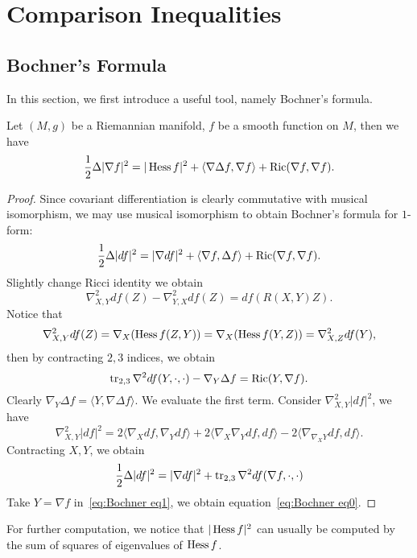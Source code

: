 \section{Comparison Inequalities}

\subsection{Bochner's Formula}

In this section, we first introduce a useful tool, namely Bochner's formula.

\begin{thm}
    Let $(M,g)$ be a Riemannian manifold, $f$ be a smooth function on $M$, then we have
    \[\frac{1}{2}\Delta|\nabla f|^2=|\operatorname{Hess}{f}|^2+\langle\nabla\Delta f,\nabla f\rangle+\operatorname{Ric}(\nabla f,\nabla f).\]
\end{thm}
\begin{proof}
    Since covariant differentiation is clearly commutative with musical isomorphism, we may use musical isomorphism to obtain Bochner's formula for $1$-form:
    \begin{equation}
        \frac{1}{2}\Delta|df|^2=|\nabla df|^2+\langle\nabla f,\Delta f\rangle+\operatorname{Ric}(\nabla f,\nabla f).\label{eq:Bochner eq0}
    \end{equation}
    Slightly change Ricci identity we obtain
    \[\nabla^2_{X,Y}df(Z)-\nabla^2_{Y,X}df(Z)=df(R(X,Y)Z).\]
    Notice that
    \[\nabla^2_{X,Y}df(Z)=\nabla_X(\operatorname{Hess}{f}(Z,Y))=\nabla_X(\operatorname{Hess}{f}(Y,Z))=\nabla^2_{X,Z}df(Y),\]
    then by contracting $2,3$ indices, we obtain
    \begin{equation}
        \operatorname{tr}_{2,3}\nabla^2df(Y,\cdot,\cdot)-\nabla_Y\Delta f=\operatorname{Ric}(Y,\nabla f).\label{eq:Bochner eq1}
    \end{equation}
    Clearly $\nabla_Y\Delta f=\langle Y,\nabla\Delta f\rangle$.
    We evaluate the first term.
    Consider $\nabla^2_{X,Y}|df|^2$, we have
    \[\nabla^2_{X,Y}|df|^2=2\langle\nabla_Xdf,\nabla_Ydf\rangle+2\langle\nabla_X\nabla_Ydf,df\rangle-2\langle\nabla_{\nabla_XY}df,df\rangle.\]
    Contracting $X,Y$, we obtain
    \[\frac{1}{2}\Delta|df|^2=|\nabla df|^2+\operatorname{tr}_{2,3}\nabla^2df(\nabla f,\cdot,\cdot)\]
    Take $Y=\nabla f$ in~\eqref{eq:Bochner eq1}, we obtain equation~\eqref{eq:Bochner eq0}.
\end{proof}

\begin{rem}
    For further computation, we notice that $|\operatorname{Hess}{f}|^2$ can usually be computed by the sum of squares of eigenvalues of $\operatorname{Hess}{f}$.
\end{rem}

